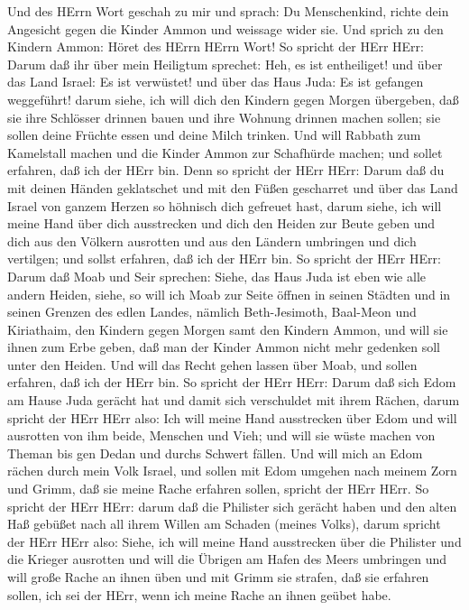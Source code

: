  Und des HErrn Wort geschah zu mir und sprach: 
Du Menschenkind, richte dein Angesicht gegen die Kinder Ammon und
weissage wider sie.  Und sprich zu den Kindern Ammon: Höret
des HErrn HErrn Wort! So spricht der HErr HErr: Darum daß ihr über mein
Heiligtum sprechet: Heh, es ist entheiliget! und über das Land Israel:
Es ist verwüstet! und über das Haus Juda: Es ist gefangen weggeführt!
 darum siehe, ich will dich den Kindern gegen Morgen
übergeben, daß sie ihre Schlösser drinnen bauen und ihre Wohnung drinnen
machen sollen; sie sollen deine Früchte essen und deine Milch trinken.
 Und will Rabbath zum Kamelstall machen und die Kinder Ammon
zur Schafhürde machen; und sollet erfahren, daß ich der HErr bin.
 Denn so spricht der HErr HErr: Darum daß du mit deinen
Händen geklatschet und mit den Füßen gescharret und über das Land Israel
von ganzem Herzen so höhnisch dich gefreuet hast,  darum
siehe, ich will meine Hand über dich ausstrecken und dich den Heiden zur
Beute geben und dich aus den Völkern ausrotten und aus den Ländern
umbringen und dich vertilgen; und sollst erfahren, daß ich der HErr bin.
 So spricht der HErr HErr: Darum daß Moab und Seir sprechen:
Siehe, das Haus Juda ist eben wie alle andern Heiden, 
siehe, so will ich Moab zur Seite öffnen in seinen Städten und in seinen
Grenzen des edlen Landes, nämlich Beth-Jesimoth, Baal-Meon und
Kiriathaim,  den Kindern gegen Morgen samt den Kindern
Ammon, und will sie ihnen zum Erbe geben, daß man der Kinder Ammon nicht
mehr gedenken soll unter den Heiden.  Und will das Recht
gehen lassen über Moab, und sollen erfahren, daß ich der HErr bin.
 So spricht der HErr HErr: Darum daß sich Edom am Hause
Juda gerächt hat und damit sich verschuldet mit ihrem Rächen,
 darum spricht der HErr HErr also: Ich will meine Hand
ausstrecken über Edom und will ausrotten von ihm beide, Menschen und
Vieh; und will sie wüste machen von Theman bis gen Dedan und durchs
Schwert fällen.  Und will mich an Edom rächen durch mein
Volk Israel, und sollen mit Edom umgehen nach meinem Zorn und Grimm, daß
sie meine Rache erfahren sollen, spricht der HErr HErr.  So
spricht der HErr HErr: darum daß die Philister sich gerächt haben und
den alten Haß gebüßet nach all ihrem Willen am Schaden (meines Volks),
 darum spricht der HErr HErr also: Siehe, ich will meine
Hand ausstrecken über die Philister und die Krieger ausrotten und will
die Übrigen am Hafen des Meers umbringen  und will große
Rache an ihnen üben und mit Grimm sie strafen, daß sie erfahren sollen,
ich sei der HErr, wenn ich meine Rache an ihnen geübet habe.

